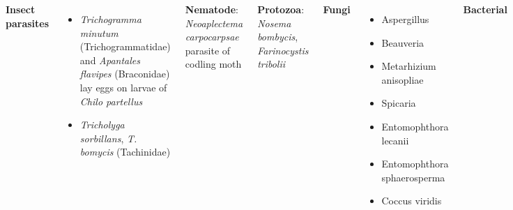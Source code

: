\documentclass[11pt,dvipsnames,ignorenonframetext,aspectratio=169]{beamer}
\providecommand{\tightlist}{%
  \setlength{\itemsep}{0pt}\setlength{\parskip}{0pt}}
\newcommand{\bcolumns}{\begin{columns}[T, onlytextwidth]}
\newcommand{\ecolumns}{\end{columns}}
\begin{document}
\begin{frame}{}
\protect\hypertarget{section-14}{}
\bcolumns
{}
\footnotesize

\textbf{Insect parasites}

\begin{itemize}
\tightlist
\item
  \emph{Trichogramma minutum} (Trichogrammatidae) and \emph{Apantales
  flavipes} (Braconidae) lay eggs on larvae of \emph{Chilo partellus}
\item
  \emph{Tricholyga sorbillans}, \emph{T. bomycis} (Tachinidae)
\end{itemize}

\textbf{Nematode}: \emph{Neoaplectema carpocarpsae} parasite of codling
moth

\textbf{Protozoa}: \emph{Nosema bombycis}, \emph{Farinocystis tribolii}

\textbf{Fungi}

\begin{itemize}
\tightlist
\item
  Aspergillus
\item
  Beauveria
\item
  Metarhizium anisopliae
\item
  Spicaria
\item
  Entomophthora lecanii
\item
  Entomophthora sphaerosperma
\item
  Coccus viridis
\end{itemize}

\footnotesize

\textbf{Bacterial}

\begin{itemize}
\tightlist
\item
  Bacillus thuringiensis is effective against, \emph{Heliocoverpa
  armigera}, \emph{Pieries brassicae}, \emph{Hellula undalis},
  \emph{Plodia interpunctella} and \emph{Tribolium confusum}
\end{itemize}

\textbf{Virus}

\begin{itemize}
\item
  NPV (Borrelina virus) is effective against Alfalfa caterpilla, Cabbage
  loper ( \emph{Trichoplusia ni}), Tobaccoo caterpillar/Beet armyworm (
  \emph{Spodoptera litura}, \emph{Spodoptera exigua}), \emph{Heliothis
  zea}, Diamond back moth ( \emph{Plutella xylostella}).
\item
  Granulosis virus (Bergoldia virus) is effective against Potato tuber
  moth ( \emph{Gnoremoschema opercullela}), Codling moth
\item
  \emph{Rhizoctonia solanii} and \emph{Didymella exitalis} putrates
  kills hyphal cells of Ophiobolus graminis (Fungal pathogen of wheat)
\end{itemize}

\ecolumns
\end{frame}
\end{document}
